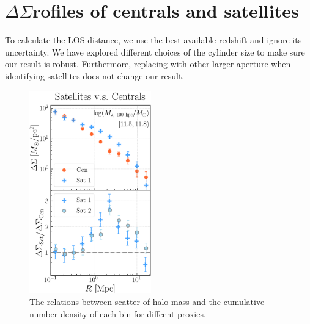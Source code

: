 \documentclass[fleqn,usenatbib,useAMS,english]{mnras}
\begin{document}
\section{\texorpdfstring{$\Delta\Sigma$} profiles of centrals and satellites}
	\label{app:sat_cen}

    To calculate the LOS distance, we use the best available redshift and ignore its uncertainty.
    We have explored different choices of the cylinder size to make sure our result is robust.
    Furthermore, replacing \mmax{} with other larger aperture \mstar{} when identifying
    satellites does not change our result.
    

  \begin{figure}
      \centering
      \includegraphics[width=0.47\textwidth]{figure/topn_fig_appendix_4}
      \caption{
          The relations between scatter of halo mass and the cumulative number density of each
          \topn{} bin for diffeent \mhalo{} proxies.
      }
      \label{fig:sat_cen}
  \end{figure}
\end{document}
